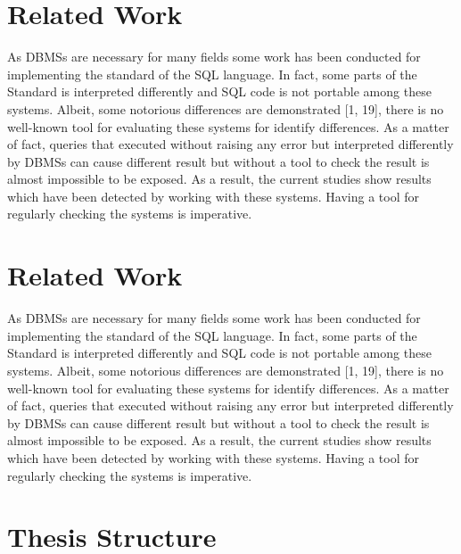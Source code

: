 \section{Related Work }
As DBMSs are necessary for many fields some work has been conducted for implementing the standard of the SQL language. In fact, some parts of the Standard is interpreted differently and SQL code is not portable among these systems. Albeit, some notorious differences are demonstrated [1, 19], there is no well-known tool for evaluating these systems for identify differences. As a matter of fact, queries that executed without raising any error but interpreted differently by DBMSs can cause different result but without a tool to check the result is almost impossible to be exposed.  As a result, the current studies show results which have been detected by working with these systems. Having a tool for regularly checking the systems is imperative. 
 
\section{Related Work}
 As DBMSs are necessary for many fields some work has been conducted for implementing the standard of the SQL language. In fact, some parts of the Standard is interpreted differently and SQL code is not portable among these systems. Albeit, some notorious differences are demonstrated [1, 19], there is no well-known tool for evaluating these systems for identify differences. As a matter of fact, queries that executed without raising any error but interpreted differently by DBMSs can cause different result but without a tool to check the result is almost impossible to be exposed.  As a result, the current studies show results which have been detected by working with these systems. Having a tool for regularly checking the systems is imperative.  
 
 
 \section{Thesis Structure}

